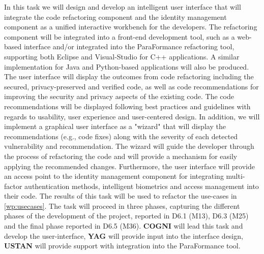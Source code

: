 \begin{Workpackage}{\thewpno}
\begin{WPDescription}
\end{WPDescription}

\begin{Task}
\TaskResults{%
}
\TaskHeader{}
In this task we will design and develop an intelligent user interface that will integrate the code refactoring component and the identity management component as a unified interactive workbench for the developers. The refactoring component will be integrated into a front-end development tool, such as a web-based interface and/or integrated into the ParaFormance refactoring tool, supporting both Eclipse and Visual-Studio for C++ applications. A similar implementation for Java and Python-based applications will also be produced. The user interface will display the outcomes from code refactoring including the secured, privacy-preserved and verified code, as well as code recommendations for improving the security and privacy aspects of the existing code. The code recommendations will be displayed following best practices and guidelines with regards to usability, user experience and user-centered design. In addition, we will implement a graphical user interface as a "wizard" that will display the recommendations (e.g., code fixes) along with the severity of each detected vulnerability and recommendation. The wizard will guide the developer through the process of refactoring the code and will provide a mechanism for easily applying the recommended changes. Furthermore, the user interface will provide an access point to the identity management component for integrating multi-factor authentication methods, intelligent biometrics and access management into their code. The results of this task will be used to refactor the use-cases in \ref{wp:usecases}. The task will proceed in three phases, capturing the different phases of the development of the project, reported in D6.1 (M13), D6.3 (M25) and the final phase reported in D6.5 (M36). \textbf{COGNI} will lead this task and develop the user-interface, \textbf{YAG} will provide input into the interface design, \textbf{USTAN} will provide support with integration into the ParaFormance tool.


\end{Task}
\end{Workpackage}
